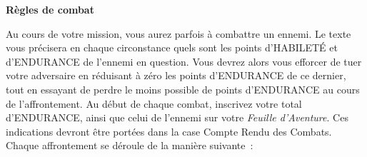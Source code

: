 \documentclass[10pt]{book}
\begin{document}
\begin{center}
  \textbf{Règles de combat}
\end{center}
Au cours de votre mission, vous aurez parfois à combattre un ennemi. Le texte vous
précisera en chaque circonstance quels sont les points d'HABILETÉ et d'ENDURANCE de
l'ennemi en question. Vous devrez alors vous efforcer de tuer votre adversaire en
réduisant à zéro les points d'ENDURANCE de ce dernier, tout en essayant de perdre
le moins possible de points d'ENDURANCE au cours de l'affrontement. Au début de
chaque combat, inscrivez votre total d'ENDURANCE, ainsi que celui de l'ennemi sur
votre \textit{Feuille d'Aventure}. Ces indications devront être portées dans la case
Compte Rendu des Combats.\\

Chaque affrontement se déroule de la manière suivante~:
\end{document}
